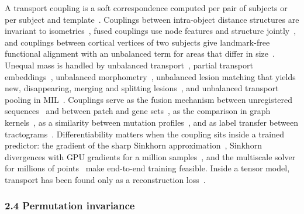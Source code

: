 \documentclass[journal,onecolumn]{IEEEtran}
\begin{document}
A transport coupling is a soft correspondence computed per pair of subjects or per subject and template~\cite{Cuturi2013Sinkhorn,Peyre2019Computational}. Couplings between intra-object distance structures are invariant to isometries~\cite{Memoli2011GromovWasserstein}, fused couplings use node features and structure jointly~\cite{Vayer2019Structured}, and couplings between cortical vertices of two subjects give landmark-free functional alignment with an unbalanced term for areas that differ in size~\cite{Thual2022Aligning}. Unequal mass is handled by unbalanced transport~\cite{Chizat2018Scaling,Sejourne2021Unbalanced}, partial transport embeddings~\cite{Bai2023Linear,Bai2025Linear}, unbalanced morphometry~\cite{Gerber2018Exploratory}, unbalanced lesion matching that yields new, disappearing, merging and splitting lesions~\cite{Qahqaie2026Unbalanced}, and unbalanced transport pooling in MIL~\cite{Ren2025OTSurv}. Couplings serve as the fusion mechanism between unregistered sequences~\cite{Gong2026Robust} and between patch and gene sets~\cite{Xu2023Multimodal,Song2024Multimodal}, as the comparison in graph kernels~\cite{Togninalli2019Wasserstein}, as a similarity between mutation profiles~\cite{Little2023Associating}, and as label transfer between tractograms~\cite{Feydy2019Fast}. Differentiability matters when the coupling sits inside a trained predictor: the gradient of the sharp Sinkhorn approximation~\cite{Luise2018Differential}, Sinkhorn divergences with GPU gradients for a million samples~\cite{Feydy2019Interpolating}, and the multiscale solver for millions of points~\cite{Feydy2019Fast} make end-to-end training feasible. Inside a tensor model, transport has been found only as a reconstruction loss~\cite{Afshar2021SWIFT}.

\subsubsection{2.4 Permutation invariance}
\end{document}
